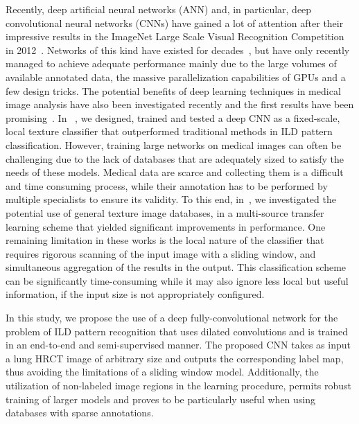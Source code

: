 \documentclass[journal]{IEEEtran}
\begin{document}
Recently, deep artificial neural networks (ANN) and, in particular, deep convolutional neural networks (CNNs) have gained a lot of attention after their impressive results in the ImageNet Large Scale Visual Recognition Competition in 2012~\cite{ILSVRC15}. Networks of this kind have existed for decades~\cite{lecun98}, but have only recently managed to achieve adequate performance mainly due to the large volumes of available annotated data, the  massive parallelization capabilities of GPUs and a few design tricks. The potential benefits of deep learning techniques in medical image analysis have also been investigated recently and the first results have been promising~\cite{greenspan2016tmiguest}. In~\cite{AnthimoTMI} , we designed, trained and tested a deep CNN as a fixed-scale, local texture classifier that outperformed traditional methods in ILD pattern classification. However, training large networks on medical images can often be challenging due to the lack of databases that are adequately sized to satisfy the needs of these models. Medical data are scarce and collecting them is a difficult and time consuming process, while their annotation has to be performed by multiple specialists to ensure its validity. To this end, in~\cite{christodoulidis2017multi}, we investigated the potential use of general texture image databases, in a multi-source transfer learning scheme that yielded significant improvements in performance. One remaining limitation in these works is the local nature of the classifier that requires rigorous scanning of the input image with a sliding window, and simultaneous aggregation of the results in the output. This classification scheme can be significantly time-consuming while it may also ignore less local but useful information, if the input size is not appropriately configured.

In this study, we propose the use of a deep fully-convolutional network for the problem of ILD pattern recognition that uses dilated convolutions and is trained in an end-to-end and semi-supervised manner. The proposed CNN takes as input a lung HRCT image of arbitrary size and outputs the corresponding label map, thus avoiding the limitations of a sliding window model. Additionally, the utilization of non-labeled image regions in the learning procedure, permits robust training of larger models and proves to be particularly useful when using databases with sparse annotations.

\end{document}

